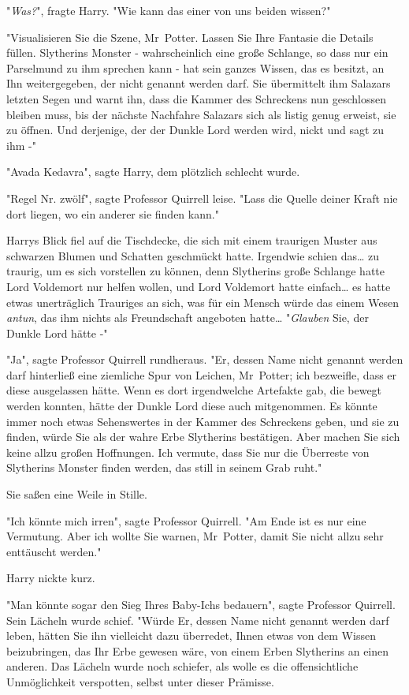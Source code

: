 {"\emph{Was?}", fragte Harry. "Wie kann das einer von uns beiden wissen?"

"Visualisieren Sie die Szene, Mr~Potter. Lassen Sie Ihre Fantasie die Details füllen. Slytherins Monster - wahrscheinlich eine große Schlange, so dass nur ein Parselmund zu ihm sprechen kann - hat sein ganzes Wissen, das es besitzt, an Ihn weitergegeben, der nicht genannt werden darf. Sie übermittelt ihm Salazars letzten Segen und warnt ihn, dass die Kammer des Schreckens nun geschlossen bleiben muss, bis der nächste Nachfahre Salazars sich als listig genug erweist, sie zu öffnen. Und derjenige, der der Dunkle Lord werden wird, nickt und sagt zu ihm -"

"Avada Kedavra", sagte Harry, dem plötzlich schlecht wurde.

"Regel Nr. zwölf", sagte Professor Quirrell leise. "Lass die Quelle deiner Kraft nie dort liegen, wo ein anderer sie finden kann."

Harrys Blick fiel auf die Tischdecke, die sich mit einem traurigen Muster aus schwarzen Blumen und Schatten geschmückt hatte. Irgendwie schien das… zu traurig, um es sich vorstellen zu können, denn Slytherins große Schlange hatte Lord Voldemort nur helfen wollen, und Lord Voldemort hatte einfach… es hatte etwas unerträglich Trauriges an sich, was für ein Mensch würde das einem Wesen \emph{antun}, das ihm nichts als Freundschaft angeboten hatte… "\emph{Glauben} Sie, der Dunkle Lord hätte -"

"Ja", sagte Professor Quirrell rundheraus. "Er, dessen Name nicht genannt werden darf hinterließ eine ziemliche Spur von Leichen, Mr~Potter; ich bezweifle, dass er diese ausgelassen hätte. Wenn es dort irgendwelche Artefakte gab, die bewegt werden konnten, hätte der Dunkle Lord diese auch mitgenommen. Es könnte immer noch etwas Sehenswertes in der Kammer des Schreckens geben, und sie zu finden, würde Sie als der wahre Erbe Slytherins bestätigen. Aber machen Sie sich keine allzu großen Hoffnungen. Ich vermute, dass Sie nur die Überreste von Slytherins Monster finden werden, das still in seinem Grab ruht."

Sie saßen eine Weile in Stille.

"Ich könnte mich irren", sagte Professor Quirrell. "Am Ende ist es nur eine Vermutung. Aber ich wollte Sie warnen, Mr~Potter, damit Sie nicht allzu sehr enttäuscht werden."

Harry nickte kurz.

"Man könnte sogar den Sieg Ihres Baby-Ichs bedauern", sagte Professor Quirrell. Sein Lächeln wurde schief. "Würde Er, dessen Name nicht genannt werden darf leben, hätten Sie ihn vielleicht dazu überredet, Ihnen etwas von dem Wissen beizubringen, das Ihr Erbe gewesen wäre, von einem Erben Slytherins an einen anderen. Das Lächeln wurde noch schiefer, als wolle es die offensichtliche Unmöglichkeit verspotten, selbst unter dieser Prämisse.

}
